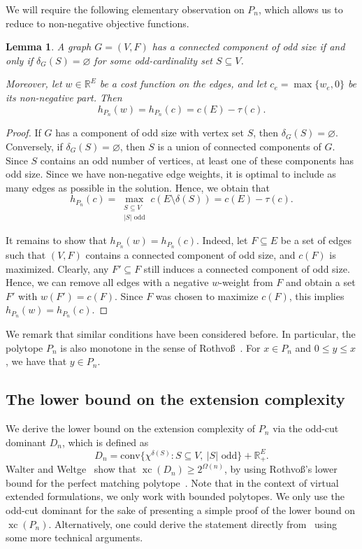 \documentclass[centering,11pt,reqno]{amsart}
\newtheorem{lem}[theorem]{Lemma}
\theoremstyle{definition}
\renewcommand{\emptyset}{\varnothing}
\newcommand{\R}{\mathbb{R}}
\newcommand{\conv}{\mathrm{conv}}
\DeclareMathOperator{\xc}{xc}
\def\R{\mathbb{R}}
\begin{document}
We will require the following elementary observation on $P_n$, which allows us to reduce to non-negative objective functions.
\begin{lem}\label{lem:monotone}
    A graph $G=(V,F)$ has a connected component of odd size if and only if
    $\delta_G(S)=\emptyset$ for some odd-cardinality set $S\subseteq V$.

    Moreover, let $w\in\R^E$ be a cost function on the edges, and let $c_e=\max\{w_e,0\}$ be its non-negative part.
    Then
    \[
        h_{P_n}(w)=h_{P_n}(c)=c(E)-\tau(c).
    \]
\end{lem}
\begin{proof}
    If $G$ has a component of odd size with vertex set $S$, then $\delta_G(S)=\emptyset$.
    Conversely, if $\delta_G(S)=\emptyset$, then $S$ is a union of connected
    components of $G$.
    Since $S$ contains an odd number of vertices, at least one of these components has odd size.
    Since we have non-negative edge weights, it is optimal to include as many edges as possible in the solution.
    Hence, we obtain that 
    \[
        h_{P_n}(c)=\max_{\substack{S\subseteq V\\|S|\text{ odd}}}
          c(E\setminus\delta(S))
        =c(E)-\tau(c).
    \]
    
    It remains to show that $h_{P_n}(w)=h_{P_n}(c)$.
    Indeed, let $F\subseteq E$ be a set of edges such that $(V,F)$ contains a connected component of odd size, and $c(F)$ is maximized.
    Clearly, any $F'\subseteq F$ still induces a connected component of odd size.
    Hence, we can remove all edges with a negative $w$-weight from $F$ and obtain a set $F'$ with $w(F')=c(F)$.
    Since $F$ was chosen to maximize $c(F)$, this implies $h_{P_n}(w)=h_{P_n}(c)$.
\end{proof}
We remark that similar conditions have been considered before.
In particular, the polytope $P_n$ is also monotone in the sense of Rothvo{\ss}~\cite{MatchingExtensions}.
For $x\in P_n$ and $0\le y\le x$, we have that $y\in P_n$.

\subsection{The lower bound on the extension complexity}
We derive the lower bound on the extension complexity of $P_n$ via the odd-cut dominant $D_n$, which is defined as
\[
    D_n=\conv\{\chi^{\delta(S)}:S\subseteq V,\ |S|\text{ odd}\}+\R_+^E.
\]
Walter and Weltge~\cite{WalterWeltgeRadialCones}
show that $\xc(D_n)\ge2^{\Omega(n)}$, by using Rothvo{\ss}'s lower bound for the
perfect matching polytope~\cite{MatchingExtensions}.
Note that in the context of virtual extended formulations, we only work with bounded polytopes. 
We only use the odd-cut dominant for the sake of presenting a simple proof of the lower bound on $\xc(P_n)$.
Alternatively, one could derive the statement directly from~\cite{MatchingExtensions} using some more technical arguments.
\end{document}
